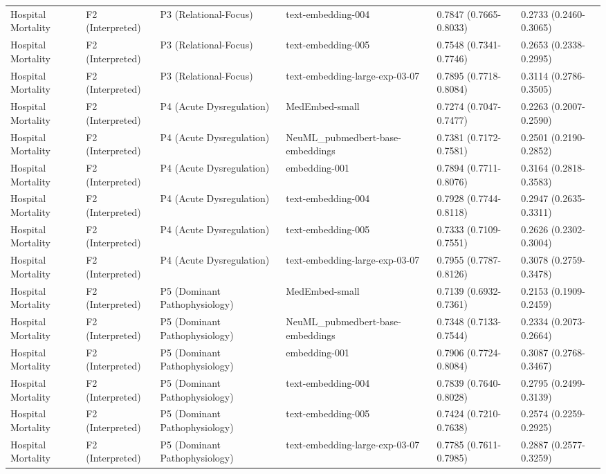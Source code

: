 \documentclass[border=0pt]{standalone}
\begin{document}
\begin{adjustbox}{width=\textwidth}
\begin{tabular}{llllll}
Hospital Mortality & F2 (Interpreted) & P3 (Relational-Focus) & text-embedding-004 & 0.7847 (0.7665-0.8033) & 0.2733 (0.2460-0.3065) \\
Hospital Mortality & F2 (Interpreted) & P3 (Relational-Focus) & text-embedding-005 & 0.7548 (0.7341-0.7746) & 0.2653 (0.2338-0.2995) \\
Hospital Mortality & F2 (Interpreted) & P3 (Relational-Focus) & text-embedding-large-exp-03-07 & 0.7895 (0.7718-0.8084) & 0.3114 (0.2786-0.3505) \\
Hospital Mortality & F2 (Interpreted) & P4 (Acute Dysregulation) & MedEmbed-small & 0.7274 (0.7047-0.7477) & 0.2263 (0.2007-0.2590) \\
Hospital Mortality & F2 (Interpreted) & P4 (Acute Dysregulation) & NeuML\_pubmedbert-base-embeddings & 0.7381 (0.7172-0.7581) & 0.2501 (0.2190-0.2852) \\
Hospital Mortality & F2 (Interpreted) & P4 (Acute Dysregulation) & embedding-001 & 0.7894 (0.7711-0.8076) & 0.3164 (0.2818-0.3583) \\
Hospital Mortality & F2 (Interpreted) & P4 (Acute Dysregulation) & text-embedding-004 & 0.7928 (0.7744-0.8118) & 0.2947 (0.2635-0.3311) \\
Hospital Mortality & F2 (Interpreted) & P4 (Acute Dysregulation) & text-embedding-005 & 0.7333 (0.7109-0.7551) & 0.2626 (0.2302-0.3004) \\
Hospital Mortality & F2 (Interpreted) & P4 (Acute Dysregulation) & text-embedding-large-exp-03-07 & 0.7955 (0.7787-0.8126) & 0.3078 (0.2759-0.3478) \\
Hospital Mortality & F2 (Interpreted) & P5 (Dominant Pathophysiology) & MedEmbed-small & 0.7139 (0.6932-0.7361) & 0.2153 (0.1909-0.2459) \\
Hospital Mortality & F2 (Interpreted) & P5 (Dominant Pathophysiology) & NeuML\_pubmedbert-base-embeddings & 0.7348 (0.7133-0.7544) & 0.2334 (0.2073-0.2664) \\
Hospital Mortality & F2 (Interpreted) & P5 (Dominant Pathophysiology) & embedding-001 & 0.7906 (0.7724-0.8084) & 0.3087 (0.2768-0.3467) \\
Hospital Mortality & F2 (Interpreted) & P5 (Dominant Pathophysiology) & text-embedding-004 & 0.7839 (0.7640-0.8028) & 0.2795 (0.2499-0.3139) \\
Hospital Mortality & F2 (Interpreted) & P5 (Dominant Pathophysiology) & text-embedding-005 & 0.7424 (0.7210-0.7638) & 0.2574 (0.2259-0.2925) \\
Hospital Mortality & F2 (Interpreted) & P5 (Dominant Pathophysiology) & text-embedding-large-exp-03-07 & 0.7785 (0.7611-0.7985) & 0.2887 (0.2577-0.3259) \\

\end{tabular}
\end{adjustbox}
\end{document}
